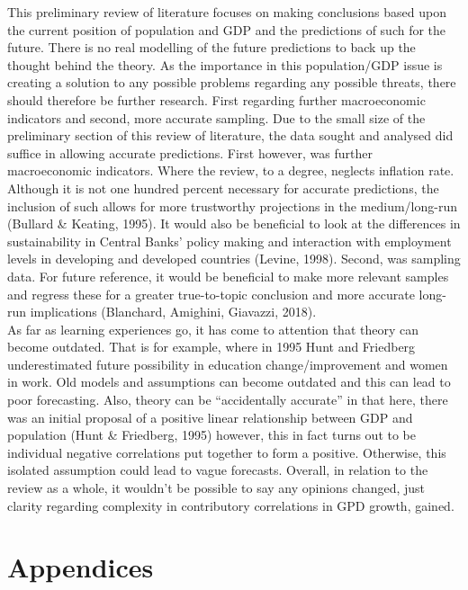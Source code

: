 \documentclass[11pt, english]{article}
\begin{document}
	This preliminary review of literature focuses on making conclusions based upon the current position of population and GDP and the predictions of such for the future. There is no real modelling of the future predictions to back up the thought behind the theory. As the importance in this population/GDP issue is creating a solution to any possible problems regarding any possible threats, there should therefore be further research. First regarding further macroeconomic indicators and second, more accurate sampling. Due to the small size of the preliminary section of this review of literature, the data sought and analysed did suffice in allowing accurate predictions. First however, was further macroeconomic indicators. Where the review, to a degree, neglects inflation rate. Although it is not one hundred percent necessary for accurate predictions, the inclusion of such allows for more trustworthy projections in the medium/long-run (Bullard \& Keating, 1995). It would also be beneficial to look at the differences in sustainability in Central Banks' policy making and interaction with employment levels in developing and developed countries (Levine, 1998). Second, was sampling data. For future reference, it would be beneficial to make more relevant samples and regress these for a greater true-to-topic conclusion and more accurate long-run implications (Blanchard, Amighini, Giavazzi, 2018).\\

	As far as learning experiences go, it has come to attention that theory can become outdated. That is for example, where in 1995 Hunt and Friedberg underestimated future possibility in education change/improvement and women in work. Old models and assumptions can become outdated and this can lead to poor forecasting. Also, theory can be ``accidentally accurate'' in that here, there was an initial proposal of a positive linear relationship between GDP and population (Hunt \& Friedberg, 1995) however, this in fact turns out to be individual negative correlations put together to form a positive. Otherwise, this isolated assumption could lead to vague forecasts. Overall, in relation to the review as a whole, it wouldn't be possible to say any opinions changed, just clarity regarding complexity in contributory correlations in GPD growth, gained.

\newpage

\section{Appendices}
\end{document}
